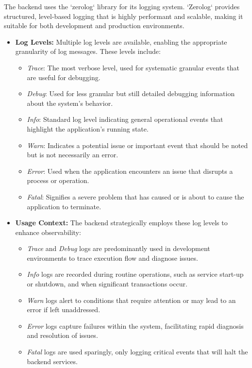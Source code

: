 
The backend uses the `zerolog` library for its logging system.
`Zerolog` provides structured, level-based logging that is highly performant and scalable, making it suitable for both development and production environments.

\begin{itemize}
    \item \textbf{Log Levels:} Multiple log levels are available, enabling the appropriate granularity of log messages.
    These levels include:
    \begin{itemize}
        \item \textit{Trace}: The most verbose level, used for systematic granular events that are useful for debugging.
        \item \textit{Debug}: Used for less granular but still detailed debugging information about the system's behavior.
        \item \textit{Info}: Standard log level indicating general operational events that highlight the application's running state.
        \item \textit{Warn}: Indicates a potential issue or important event that should be noted but is not necessarily an error.
        \item \textit{Error}: Used when the application encounters an issue that disrupts a process or operation.
        \item \textit{Fatal}: Signifies a severe problem that has caused or is about to cause the application to terminate.
    \end{itemize}
    \item \textbf{Usage Context:} The backend strategically employs these log levels to enhance observability:
    \begin{itemize}
        \item \textit{Trace} and \textit{Debug} logs are predominantly used in development environments to trace execution flow and diagnose issues.
        \item \textit{Info} logs are recorded during routine operations, such as service start-up or shutdown, and when significant transactions occur.
        \item \textit{Warn} logs alert to conditions that require attention or may lead to an error if left unaddressed.
        \item \textit{Error} logs capture failures within the system, facilitating rapid diagnosis and resolution of issues.
        \item \textit{Fatal} logs are used sparingly, only logging critical events that will halt the backend services.
    \end{itemize}
\end{itemize}

